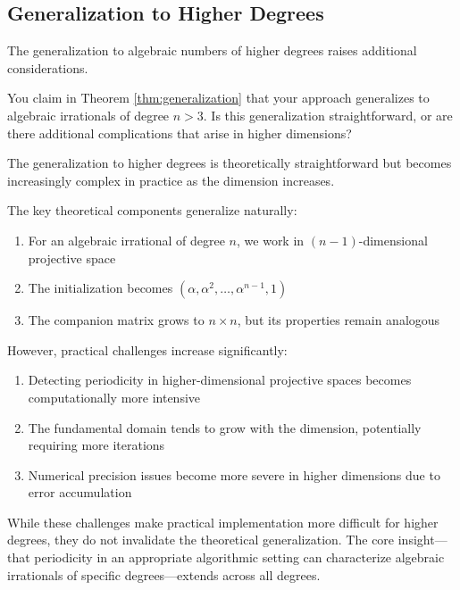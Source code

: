 \subsection{Generalization to Higher Degrees}

The generalization to algebraic numbers of higher degrees raises additional considerations.

\begin{objection}
You claim in Theorem \ref{thm:generalization} that your approach generalizes to algebraic irrationals of degree $n > 3$. Is this generalization straightforward, or are there additional complications that arise in higher dimensions?
\end{objection}

\begin{response}
The generalization to higher degrees is theoretically straightforward but becomes increasingly complex in practice as the dimension increases.

The key theoretical components generalize naturally:
\begin{enumerate}
    \item For an algebraic irrational of degree $n$, we work in $(n-1)$-dimensional projective space
    \item The initialization becomes $(\alpha, \alpha^2, \ldots, \alpha^{n-1}, 1)$
    \item The companion matrix grows to $n \times n$, but its properties remain analogous
\end{enumerate}

However, practical challenges increase significantly:
\begin{enumerate}
    \item Detecting periodicity in higher-dimensional projective spaces becomes computationally more intensive
    \item The fundamental domain tends to grow with the dimension, potentially requiring more iterations
    \item Numerical precision issues become more severe in higher dimensions due to error accumulation
\end{enumerate}

While these challenges make practical implementation more difficult for higher degrees, they do not invalidate the theoretical generalization. The core insight—that periodicity in an appropriate algorithmic setting can characterize algebraic irrationals of specific degrees—extends across all degrees.
\end{response}

